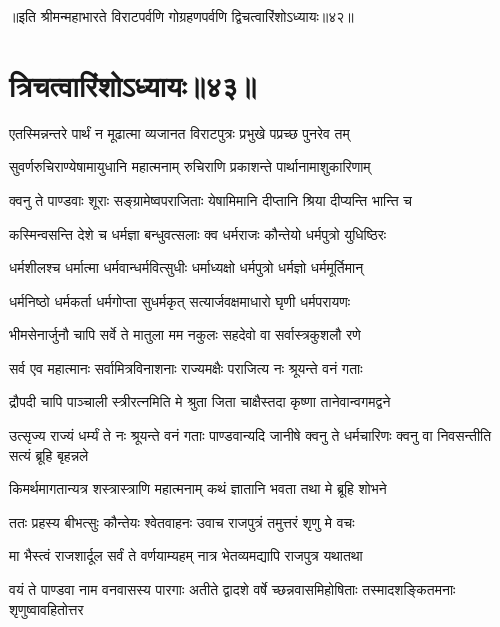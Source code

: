 ॥इति श्रीमन्महाभारते विराटपर्वणि गोग्रहणपर्वणि द्विचत्वारिंशोऽध्यायः॥४२॥

\chapter{त्रिचत्वारिंशोऽध्यायः॥४३॥}

\twolineshloka
{एतस्मिन्नन्तरे पार्थं न मूढात्मा व्यजानत}
{विराटपुत्रः प्रभुखे पप्रच्छ पुनरेव तम्}


\twolineshloka
{सुवर्णरुचिराण्येषामायुधानि महात्मनाम्}
{रुचिराणि प्रकाशन्ते पार्थानामाशुकारिणाम्}


\twolineshloka
{क्वनु ते पाण्डवाः शूराः सङ्ग्रामेष्वपराजिताः}
{येषामिमानि दीप्तानि श्रिया दीप्यन्ति भान्ति च}



\twolineshloka
{कस्मिन्वसन्ति देशे च धर्मज्ञा बन्धुवत्सलाः}
{क्व धर्मराजः कौन्तेयो धर्मपुत्रो युधिष्ठिरः}


\twolineshloka
{धर्मशीलश्च धर्मात्मा धर्मवान्धर्मवित्सुधीः}
{धर्माध्यक्षो धर्मपुत्रो धर्मज्ञो धर्ममूर्तिमान्}


\twolineshloka
{धर्मनिष्ठो धर्मकर्ता धर्मगोप्ता सुधर्मकृत्}
{सत्यार्जवक्षमाधारो घृणी धर्मपरायणः}


\twolineshloka
{भीमसेनार्जुनौ चापि सर्वे ते मातुला मम}
{नकुलः सहदेवो वा सर्वास्त्रकुशलौ रणे}


\twolineshloka
{सर्व एव महात्मानः सर्वामित्रविनाशनाः}
{राज्यमक्षैः पराजित्य नः श्रूयन्ते वनं गताः}


\twolineshloka
{द्रौपदी चापि पाञ्चाली स्त्रीरत्नमिति मे श्रुता}
{जिता चाक्षैस्तदा कृष्णा तानेवान्वगमद्वने}


\onelineshloka
{उत्सृज्य राज्यं धर्म्यं ते नः श्रूयन्ते वनं गताः}
\twolineshloka
{पाण्डवान्यदि जानीषे क्वनु ते धर्मचारिणः}
{क्वनु वा निवसन्तीति सत्यं ब्रूहि बृहन्नले}


\twolineshloka
{किमर्थमागतान्यत्र शस्त्रास्त्राणि महात्मनाम्}
{कथं ज्ञातानि भवता तथा मे ब्रूहि शोभने}



\twolineshloka
{ततः प्रहस्य बीभत्सुः कौन्तेयः श्वेतवाहनः}
{उवाच राजपुत्रं तमुत्तरं शृणु मे वचः}


\twolineshloka
{मा भैस्त्वं राजशार्दूल सर्वं ते वर्णयाम्यहम्}
{नात्र भेतव्यमद्यापि राजपुत्र यथातथा}


\threelineshloka
{वयं ते पाण्डवा नाम वनवासस्य पारगाः}
{अतीते द्वादशे वर्षे च्छन्नवासमिहोषिताः}
{तस्मादशङ्कितमनाः शृणुष्वावहितोत्तर}


